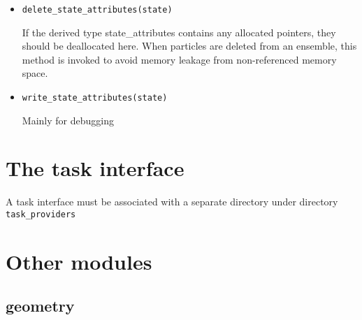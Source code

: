 \begin{itemize}
\item {\tt  delete\_state\_attributes(state)}  

If the derived type state\_attributes contains any allocated
pointers, they should be deallocated here. When particles are
deleted from an ensemble, this method is invoked to avoid
memory leakage from non-referenced memory space.


\item {\tt  write\_state\_attributes(state)} 

Mainly for debugging

\end{itemize}




\section{The task interface}

A task interface
must be associated with a separate directory under directory {\tt task\_providers}

\section{Other modules}
\subsection{geometry}

